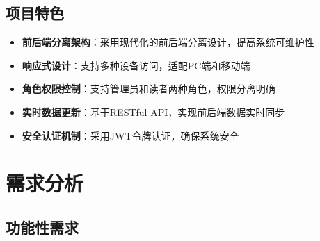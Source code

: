 \documentclass[12pt,a4paper]{article}
\begin{document}
\subsection{项目特色}
\begin{itemize}
    \item \textbf{前后端分离架构}：采用现代化的前后端分离设计，提高系统可维护性
    \item \textbf{响应式设计}：支持多种设备访问，适配PC端和移动端
    \item \textbf{角色权限控制}：支持管理员和读者两种角色，权限分离明确
    \item \textbf{实时数据更新}：基于RESTful API，实现前后端数据实时同步
    \item \textbf{安全认证机制}：采用JWT令牌认证，确保系统安全
\end{itemize}

\section{需求分析}

\subsection{功能性需求}
\end{document}
